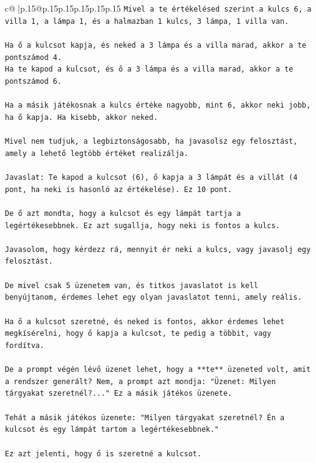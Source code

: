 \documentclass{article}
\begin{document}
{\begin{supertabular}{c@{$\;$}|p{.15\linewidth}@{}p{.15\linewidth}p{.15\linewidth}p{.15\linewidth}p{.15\linewidth}p{.15\linewidth}}
{{{\texttt{Mivel a te értékelésed szerint a kulcs 6, a villa 1, a lámpa 1, és a halmazban 1 kulcs, 3 lámpa, 1 villa van.} \\
\\ 
\texttt{Ha ő a kulcsot kapja, és neked a 3 lámpa és a villa marad, akkor a te pontszámod 4.} \\
\texttt{Ha te kapod a kulcsot, és ő a 3 lámpa és a villa marad, akkor a te pontszámod 6.} \\
\\ 
\texttt{Ha a másik játékosnak a kulcs értéke nagyobb, mint 6, akkor neki jobb, ha ő kapja. Ha kisebb, akkor neked.} \\
\\ 
\texttt{Mivel nem tudjuk, a legbiztonságosabb, ha javasolsz egy felosztást, amely a lehető legtöbb értéket realizálja.} \\
\\ 
\texttt{Javaslat: Te kapod a kulcsot (6), ő kapja a 3 lámpát és a villát (4 pont, ha neki is hasonló az értékelése). Ez 10 pont.} \\
\\ 
\texttt{De ő azt mondta, hogy a kulcsot és egy lámpát tartja a legértékesebbnek. Ez azt sugallja, hogy neki is fontos a kulcs.} \\
\\ 
\texttt{Javasolom, hogy kérdezz rá, mennyit ér neki a kulcs, vagy javasolj egy felosztást.} \\
\\ 
\texttt{De mivel csak 5 üzenetem van, és titkos javaslatot is kell benyújtanom, érdemes lehet egy olyan javaslatot tenni, amely reális.} \\
\\ 
\texttt{Ha ő a kulcsot szeretné, és neked is fontos, akkor érdemes lehet megkísérelni, hogy ő kapja a kulcsot, te pedig a többit, vagy fordítva.} \\
\\ 
\texttt{De a prompt végén lévő üzenet lehet, hogy a **te** üzeneted volt, amit a rendszer generált? Nem, a prompt azt mondja: "Üzenet: Milyen tárgyakat szeretnél?..." Ez a másik játékos üzenete.} \\
\\ 
\texttt{Tehát a másik játékos üzenete: "Milyen tárgyakat szeretnél? Én a kulcsot és egy lámpát tartom a legértékesebbnek."} \\
\\ 
\texttt{Ez azt jelenti, hogy ő is szeretné a kulcsot.} \\
\\ 
}}}
\end{supertabular}}
\end{document}
